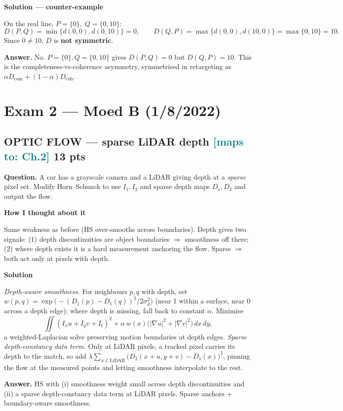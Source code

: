 \documentclass[11pt]{article}
\newcommand{\step}[1]{\smallskip\par\noindent\textbf{\textcolor{amber}{#1}}\par\nobreak}
\newcommand{\maps}[1]{{\small\textcolor{teal}{[maps to: #1]}}}
\newcommand{\ans}[1]{\begin{answer}\textbf{Answer.} #1\end{answer}}
\begin{document}
\step{Solution --- counter-example}
On the real line, $P=\{0\},\;Q=\{0,10\}$:
\[ D(P,Q)=\min\{d(0,0),d(0,10)\}=0,\qquad D(Q,P)=\max\{d(0,0),d(10,0)\}=\max\{0,10\}=10 .\]
Since $0\neq 10$, $D$ is \textbf{not symmetric}.
\ans{No. $P=\{0\},Q=\{0,10\}$ gives $D(P,Q)=0$ but $D(Q,P)=10$. This is the completeness-vs-coherence asymmetry,
symmetrised in retargeting as $\alpha D_{\text{com}}+(1-\alpha)D_{\text{coh}}$.}

\section{Exam 2 --- Moed B (1/8/2022)}

\subsection{OPTIC FLOW --- sparse LiDAR depth \hfill \maps{Ch.2} \hfill \textnormal{\small 13 pts}}
\begin{qbox}\textbf{Question.} A car has a grayscale camera and a LiDAR giving depth at a \emph{sparse} pixel set.
Modify Horn--Schunck to use $I_1,I_2$ and sparse depth maps $D_1,D_2$ and output the flow.\end{qbox}

\step{How I thought about it}
Same weakness as before (HS over-smooths across boundaries). Depth gives two signals: (1) depth discontinuities
are object boundaries $\Rightarrow$ smoothness off there; (2) where depth exists it is a hard measurement anchoring
the flow. Sparse $\Rightarrow$ both act only at pixels with depth.

\step{Solution}
\emph{Depth-aware smoothness.} For neighbours $p,q$ with depth, set
$w(p,q)=\exp\!\big(-(D_1(p)-D_1(q))^2/2\sigma_d^2\big)$ (near 1 within a surface, near 0 across a depth edge); where
depth is missing, fall back to constant $\alpha$. Minimise
\[\iint (I_xu+I_yv+I_t)^2+\alpha\,w(x)\big(|\nabla u|^2+|\nabla v|^2\big)\,dx\,dy ,\]
a weighted-Laplacian solve preserving motion boundaries at depth edges.
\emph{Sparse depth-constancy data term.} Only at LiDAR pixels, a tracked pixel carries its depth to the match, so
add $\lambda\sum_{x\in\text{LiDAR}}\big(D_2(x+u,y+v)-D_1(x)\big)^2$, pinning the flow at the measured points and
letting smoothness interpolate to the rest.
\ans{HS with (i) smoothness weight small across depth discontinuities and (ii) a sparse depth-constancy data term
at LiDAR pixels. Sparse anchors + boundary-aware smoothness.}
\end{document}
